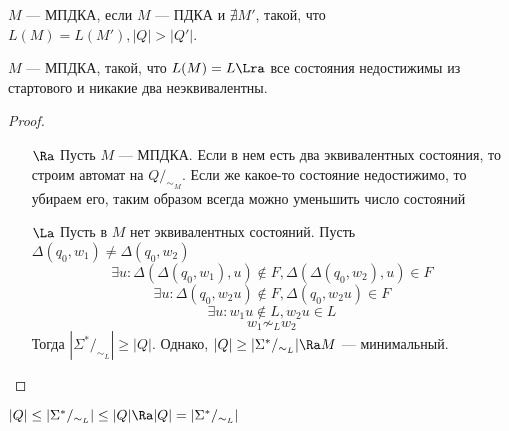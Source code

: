 \begin{definition}
    \(M\) --- МПДКА, если \(M\) --- ПДКА и \(\nexists M'\), такой, что \(L(M) = L(M'), |Q| > |Q'|\).
\end{definition}

\begin{theorem}
    \(M\) --- МПДКА, такой, что \(L(M) = L \Lra\) все состояния недостижимы из стартового и никакие два неэквивалентны.
\end{theorem}
\begin{proof}
    \begin{enumerate}
        \item[\(\Ra\)] Пусть \(M\) --- МПДКА. Если в нем есть два эквивалентных состояния, то строим автомат на \(Q/_{\sim_M}\). Если же какое-то состояние недостижимо, то убираем его, таким образом всегда можно уменьшить число состояний
        \item[\(\La\)] Пусть в \(M\) нет эквивалентных состояний. Пусть \(\Delta(q_0, w_1) \ne \Delta(q_0, w_2)\)
        \[\exists u: \Delta(\Delta(q_0, w_1), u) \notin F, \Delta(\Delta(q_0, w_2), u) \in F\]
        \[\exists u: \Delta(q_0, w_2u) \notin F, \Delta(q_0, w_2u) \in F\]
        \[\exists u: w_1u \notin L, w_2u \in L\]
        \[w_1 \not\sim_L w_2\]
        Тогда \(|\Sigma^*/_{\sim_L}| \ge |Q|\). Однако, \(|Q| \ge |\Sigma^*/_{\sim_L}| \Ra M\) --- минимальный.
    \end{enumerate}
\end{proof}

\begin{note}
    \(|Q| \le |\Sigma^*/_{\sim_L}| \le |Q| \Ra |Q| = |\Sigma^*/_{\sim_L}|\)
\end{note}